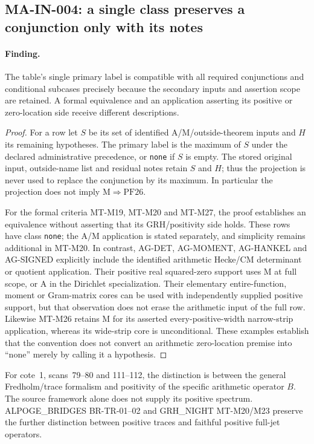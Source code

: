\subsection{MA-IN-004: a single class preserves a conjunction only with its notes}

\paragraph{Finding.}
The table's single primary label is compatible with all required
conjunctions and conditional subcases precisely because the secondary
inputs and assertion scope are retained.  A formal equivalence and an
application asserting its positive or zero-location side receive
different descriptions.

\begin{proof}
For a row let $S$ be its set of identified A/M/outside-theorem inputs
and $H$ its remaining hypotheses.  The primary label is the maximum of
$S$ under the declared administrative precedence, or \texttt{none}
if $S$ is empty.  The stored original input, outside-name list and
residual notes retain $S$ and $H$; thus the projection is never used to
replace the conjunction by its maximum.  In particular the projection
does not imply $\mathrm{M}\Rightarrow\mathrm{PF26}$.

For the formal criteria MT-M19, MT-M20 and MT-M27, the proof establishes
an equivalence without asserting that its GRH/positivity side holds.
These rows have class \texttt{none}; the A/M application is stated
separately, and simplicity remains additional in MT-M20.  In contrast,
AG-DET, AG-MOMENT, AG-HANKEL and AG-SIGNED explicitly include the
identified arithmetic Hecke/CM determinant or quotient application.
Their positive real squared-zero support uses M at full scope, or A
in the Dirichlet specialization.  Their elementary entire-function,
moment or Gram-matrix cores can be used with independently supplied
positive support, but that observation does not erase the arithmetic
input of the full row.  Likewise MT-M26 retains M for its asserted
every-positive-width narrow-strip application, whereas its wide-strip
core is unconditional.  These examples establish that the convention
does not convert an arithmetic zero-location premise into ``none''
merely by calling it a hypothesis.
\end{proof}

For cote~1, scans~79--80 and 111--112, the distinction is between the
general Fredholm/trace formalism and positivity of the specific
arithmetic operator $B$.  The source framework alone does not supply
its positive spectrum.  ALPOGE\_BRIDGES BR-TR-01--02 and
GRH\_NIGHT MT-M20/M23 preserve the further distinction between positive
traces and faithful positive full-jet operators.

